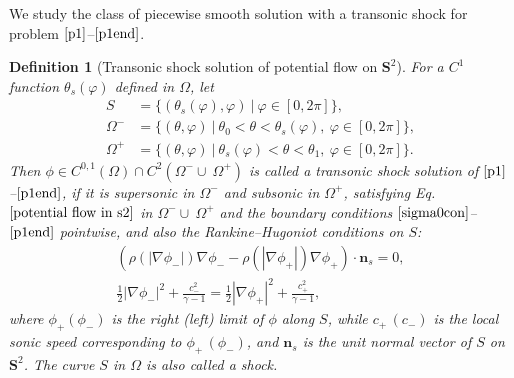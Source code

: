 \documentclass[10pt,a4paper]{amsart}
\newtheorem{definition}{Definition}[section]
\numberwithin{equation}{section}
\begin{document}
We study the class of piecewise smooth solution with a transonic shock for problem $\eqref{p1}$--$\eqref{p1end}$.
\begin{definition}[Transonic shock solution of potential flow on $\mathbf{S}^2$]\label{tss}
	For a $C^1$ function $\theta_s(\varphi)$ defined in $\Omega$, let		
	\begin{align*}
		S&=\{(\theta_s(\varphi),\varphi)~|~\varphi\in[0,2\pi]\},\\
		\Omega^-&=\{(\theta,\varphi)~|~\theta_0<\theta<\theta_s(\varphi),~\varphi\in[0,2\pi]\},\\
		\Omega^+&=\{(\theta,\varphi)~|~\theta_s(\varphi)<\theta<\theta_1,~\varphi\in[0,2\pi]\}.
	\end{align*}
Then $\phi\in C^{0,1}(\Omega) \cap C^2(\Omega^-\cup~\Omega^+)$ is  called a transonic shock solution of $\eqref{p1}$--$\eqref{p1end}$, if it is supersonic in $\Omega^-$ and subsonic in $\Omega^+$, satisfying Eq.$\eqref{potential flow in s2}$ in $\Omega^-\cup~\Omega^+$ and the boundary conditions $\eqref{sigma0con}$--$\eqref{p1end}$ pointwise, and also the Rankine–Hugoniot conditions on $S$:
	\begin{align}
		(\rho(|\nabla \phi_-|)\nabla \phi_--\rho(|\nabla \phi_+|)\nabla \phi_+)\cdot \mathbf{n}_s=0,\label{rh1}\\
		\frac{1}{2}|\nabla \phi_-|^2+\frac{c^2_-}{\gamma-1}=\frac{1}{2}|\nabla \phi_+|^2+\frac{c^2_+}{\gamma-1},\label{rh2}
	\end{align}
	where $\phi_+(\phi_-)$ is the right (left) limit of $\phi$ along $S$, while $c_+\, (c_-)$ is the local sonic speed corresponding to  $\phi_+\, (\phi_-)$, and $\mathbf{n}_s$ is the unit normal vector of $S$ on $\mathbf{S}^2$. The curve $S$ in $\Omega$
	is also called a shock.
	\end{definition}
\end{document}
